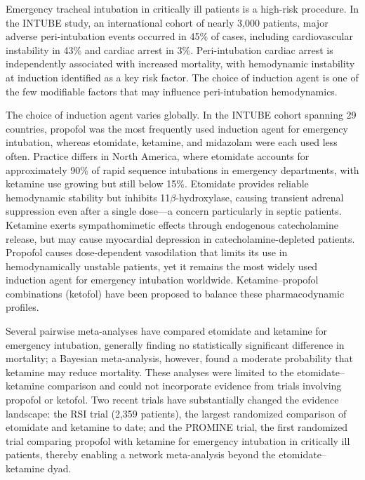 \documentclass[11pt]{article}
\begin{document}
Emergency tracheal intubation in critically ill patients is a high-risk procedure. In the INTUBE study, an international cohort of nearly 3,000 patients, major adverse peri-intubation events occurred in 45\% of cases, including cardiovascular instability in 43\% and cardiac arrest in 3\%.\cite{russotto2021} Peri-intubation cardiac arrest is independently associated with increased mortality, with hemodynamic instability at induction identified as a key risk factor.\cite{dejong2018} The choice of induction agent is one of the few modifiable factors that may influence peri-intubation hemodynamics.

The choice of induction agent varies globally. In the INTUBE cohort spanning 29 countries, propofol was the most frequently used induction agent for emergency intubation, whereas etomidate, ketamine, and midazolam were each used less often.\cite{russotto2021} Practice differs in North America, where etomidate accounts for approximately 90\% of rapid sequence intubations in emergency departments, with ketamine use growing but still below 15\%.\cite{brown2015,april2020} Etomidate provides reliable hemodynamic stability but inhibits 11$\beta$-hydroxylase, causing transient adrenal suppression even after a single dose---a concern particularly in septic patients.\cite{albert2011} Ketamine exerts sympathomimetic effects through endogenous catecholamine release, but may cause myocardial depression in catecholamine-depleted patients.\cite{waxman1980} Propofol causes dose-dependent vasodilation that limits its use in hemodynamically unstable patients, yet it remains the most widely used induction agent for emergency intubation worldwide. Ketamine--propofol combinations (ketofol) have been proposed to balance these pharmacodynamic profiles.

Several pairwise meta-analyses have compared etomidate and ketamine for emergency intubation,\cite{kotani2023,greer2025,daghmouri2025,demorais2025} generally finding no statistically significant difference in mortality; a Bayesian meta-analysis, however, found a moderate probability that ketamine may reduce mortality.\cite{koroki2024} These analyses were limited to the etomidate--ketamine comparison and could not incorporate evidence from trials involving propofol or ketofol. Two recent trials have substantially changed the evidence landscape: the RSI trial\cite{casey2025} (2,359 patients), the largest randomized comparison of etomidate and ketamine to date; and the PROMINE trial,\cite{schmidt2025} the first randomized trial comparing propofol with ketamine for emergency intubation in critically ill patients, thereby enabling a network meta-analysis beyond the etomidate--ketamine dyad.
\end{document}
